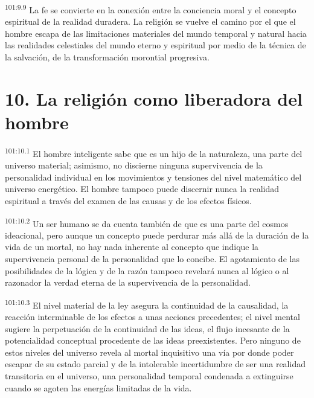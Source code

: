 \par
\textsuperscript{101:9.9} La fe se convierte en la conexión entre la conciencia moral y el concepto espiritual de la realidad duradera. La religión se vuelve el camino por el que el hombre escapa de las limitaciones materiales del mundo temporal y natural hacia las realidades celestiales del mundo eterno y espiritual por medio de la técnica de la salvación, de la transformación morontial progresiva.

\section*{10. La religión como liberadora del hombre}
\par
\textsuperscript{101:10.1} El hombre inteligente sabe que es un hijo de la naturaleza, una parte del universo material; asimismo, no discierne ninguna supervivencia de la personalidad individual en los movimientos y tensiones del nivel matemático del universo energético. El hombre tampoco puede discernir nunca la realidad espiritual a través del examen de las causas y de los efectos físicos.

\par
\textsuperscript{101:10.2} Un ser humano se da cuenta también de que es una parte del cosmos ideacional, pero aunque un concepto puede perdurar más allá de la duración de la vida de un mortal, no hay nada inherente al concepto que indique la supervivencia personal de la personalidad que lo concibe. El agotamiento de las posibilidades de la lógica y de la razón tampoco revelará nunca al lógico o al razonador la verdad eterna de la supervivencia de la personalidad.

\par
\textsuperscript{101:10.3} El nivel material de la ley asegura la continuidad de la causalidad, la reacción interminable de los efectos a unas acciones precedentes; el nivel mental sugiere la perpetuación de la continuidad de las ideas, el flujo incesante de la potencialidad conceptual procedente de las ideas preexistentes. Pero ninguno de estos niveles del universo revela al mortal inquisitivo una vía por donde poder escapar de su estado parcial y de la intolerable incertidumbre de ser una realidad transitoria en el universo, una personalidad temporal condenada a extinguirse cuando se agoten las energías limitadas de la vida.

